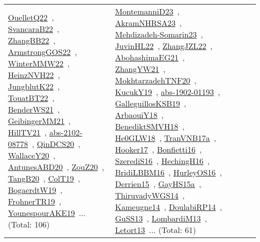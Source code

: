 {\begin{longtable}{lp{3cm}>{\raggedright\arraybackslash}p{6cm}>{\raggedright\arraybackslash}p{6cm}>{\raggedright\arraybackslash}p{8cm}}
\href{works/OuelletQ22.pdf}{OuelletQ22}~\cite{OuelletQ22}, \href{works/SvancaraB22.pdf}{SvancaraB22}~\cite{SvancaraB22}, \href{works/ZhangBB22.pdf}{ZhangBB22}~\cite{ZhangBB22}, \href{works/ArmstrongGOS22.pdf}{ArmstrongGOS22}~\cite{ArmstrongGOS22}, \href{works/WinterMMW22.pdf}{WinterMMW22}~\cite{WinterMMW22}, \href{works/HeinzNVH22.pdf}{HeinzNVH22}~\cite{HeinzNVH22}, \href{works/JungblutK22.pdf}{JungblutK22}~\cite{JungblutK22}, \href{works/TouatBT22.pdf}{TouatBT22}~\cite{TouatBT22}, \href{works/BenderWS21.pdf}{BenderWS21}~\cite{BenderWS21}, \href{works/GeibingerMM21.pdf}{GeibingerMM21}~\cite{GeibingerMM21}, \href{works/HillTV21.pdf}{HillTV21}~\cite{HillTV21}, \href{works/abs-2102-08778.pdf}{abs-2102-08778}~\cite{abs-2102-08778}, \href{works/QinDCS20.pdf}{QinDCS20}~\cite{QinDCS20}, \href{works/WallaceY20.pdf}{WallaceY20}~\cite{WallaceY20}, \href{works/AntunesABD20.pdf}{AntunesABD20}~\cite{AntunesABD20}, \href{works/ZouZ20.pdf}{ZouZ20}~\cite{ZouZ20}, \href{works/TangB20.pdf}{TangB20}~\cite{TangB20}, \href{works/ColT19.pdf}{ColT19}~\cite{ColT19}, \href{works/BogaerdtW19.pdf}{BogaerdtW19}~\cite{BogaerdtW19}, \href{works/FrohnerTR19.pdf}{FrohnerTR19}~\cite{FrohnerTR19}, \href{works/YounespourAKE19.pdf}{YounespourAKE19}~\cite{YounespourAKE19}... (Total: 106) & \href{works/MontemanniD23.pdf}{MontemanniD23}~\cite{MontemanniD23}, \href{works/AkramNHRSA23.pdf}{AkramNHRSA23}~\cite{AkramNHRSA23}, \href{works/Mehdizadeh-Somarin23.pdf}{Mehdizadeh-Somarin23}~\cite{Mehdizadeh-Somarin23}, \href{works/JuvinHL22.pdf}{JuvinHL22}~\cite{JuvinHL22}, \href{works/ZhangJZL22.pdf}{ZhangJZL22}~\cite{ZhangJZL22}, \href{works/AbohashimaEG21.pdf}{AbohashimaEG21}~\cite{AbohashimaEG21}, \href{works/ZhangYW21.pdf}{ZhangYW21}~\cite{ZhangYW21}, \href{works/MokhtarzadehTNF20.pdf}{MokhtarzadehTNF20}~\cite{MokhtarzadehTNF20}, \href{works/KucukY19.pdf}{KucukY19}~\cite{KucukY19}, \href{works/abs-1902-01193.pdf}{abs-1902-01193}~\cite{abs-1902-01193}, \href{works/GalleguillosKSB19.pdf}{GalleguillosKSB19}~\cite{GalleguillosKSB19}, \href{works/ArbaouiY18.pdf}{ArbaouiY18}~\cite{ArbaouiY18}, \href{works/BenediktSMVH18.pdf}{BenediktSMVH18}~\cite{BenediktSMVH18}, \href{works/He0GLW18.pdf}{He0GLW18}~\cite{He0GLW18}, \href{works/TranVNB17a.pdf}{TranVNB17a}~\cite{TranVNB17a}, \href{works/Hooker17.pdf}{Hooker17}~\cite{Hooker17}, \href{works/Bonfietti16.pdf}{Bonfietti16}~\cite{Bonfietti16}, \href{works/SzerediS16.pdf}{SzerediS16}~\cite{SzerediS16}, \href{works/HechingH16.pdf}{HechingH16}~\cite{HechingH16}, \href{works/BridiLBBM16.pdf}{BridiLBBM16}~\cite{BridiLBBM16}, \href{works/HurleyOS16.pdf}{HurleyOS16}~\cite{HurleyOS16}, \href{works/Derrien15.pdf}{Derrien15}~\cite{Derrien15}, \href{works/GayHS15a.pdf}{GayHS15a}~\cite{GayHS15a}, \href{works/ThiruvadyWGS14.pdf}{ThiruvadyWGS14}~\cite{ThiruvadyWGS14}, \href{works/Kameugne14.pdf}{Kameugne14}~\cite{Kameugne14}, \href{works/DoulabiRP14.pdf}{DoulabiRP14}~\cite{DoulabiRP14}, \href{works/GuSS13.pdf}{GuSS13}~\cite{GuSS13}, \href{works/LombardiM13.pdf}{LombardiM13}~\cite{LombardiM13}, \href{works/Letort13.pdf}{Letort13}~\cite{Letort13}... (Total: 61)\\

\end{longtable}}
